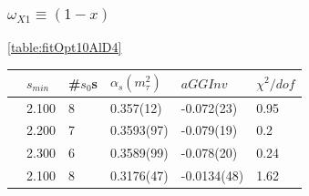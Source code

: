 \documentclass[../../index.tex]{subfiles}
\begin{document}
\subsubsection{\(\omega_{X1} \equiv (1-x)\)}
\cref{table:fitOpt10AlD4}
\begin{table}
  \centering
  \begin{tabular}{llllll}
    \toprule
    & \(s_{min}\) & \#\(s_0\)s & \(\alpha_s(m_\tau^2)\) & \(aGGInv\) & \(\chi^2/dof\)  \\
    \midrule
    \parbox[t]{2mm}{} & 2.100 & 8  & 0.357(12) & -0.072(23) & 0.95 \\
    & 2.200 & 7  & 0.3593(97) & -0.079(19) & 0.2 \\
    & 2.300 & 6  & 0.3589(99) & -0.078(20) & 0.24 \\
    \midrule     
    \parbox[t]{2mm}{} & 2.100 & 8 & 0.3176(47) & -0.0134(48) & 1.62 \\

\end{tabular}
\end{table}
\end{document}
